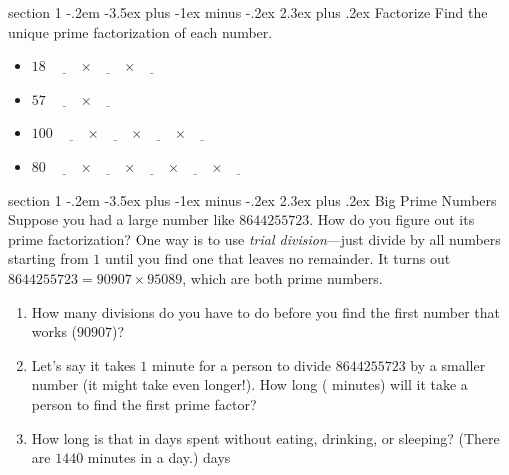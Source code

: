 \documentclass[12pt,letterpaper]{article}
\makeatletter
\newenvironment{problem}{\@startsection
       {section}
       {1}
       {-.2em}
       {-3.5ex plus -1ex minus -.2ex}
       {2.3ex plus .2ex}
       {\pagebreak[3]
       \large\bf\noindent{Problem }
       }
       }
\makeatother
\begin{document}
\begin{problem}{Factorize}
 Find the unique prime factorization of each number.

 \begin{itemize}
  \item $18$ \hfill $\underline{\hspace{2em}} \times
  \underline{\hspace{2em}} \times \underline{\hspace{2em}}$
  \item $57$ \hfill $\underline{\hspace{2em}} \times
  \underline{\hspace{2em}}$
  \item $100$ \hfill $\underline{\hspace{2em}} \times
  \underline{\hspace{2em}} \times \underline{\hspace{2em}}
  \times \underline{\hspace{2em}}$
  \item $80$ \hfill $\underline{\hspace{2em}} \times
  \underline{\hspace{2em}} \times \underline{\hspace{2em}}
  \times \underline{\hspace{2em}}
  \times \underline{\hspace{2em}}$
 \end{itemize}
\end{problem}

\begin{problem}{Big Prime Numbers}
 Suppose you had a large number like $8644255723$. How do you
 figure out its prime factorization? One way is to use
 \emph{trial division}---just divide by all numbers starting from
 $1$ until you find one that leaves no remainder. It turns out
 $8644255723 = 90907\times95089$, which are both prime numbers. 
 
 \begin{enumerate}
  \item How many divisions do you have to do before you find the first
  number that works ($90907$)?
  \item Let's say it takes $1$ minute for a person to divide
  $8644255723$ by a smaller number (it might take even longer!).
  How long (\underline{\hspace{5em}} minutes) will it take a person to find the first
  prime factor?
  \item How long is that in days spent without eating, drinking, or sleeping?
  (There are $1440$ minutes in a day.) \hfill \underline{\hspace{2em}} days
 \end{enumerate}

\end{problem}
\end{document}
